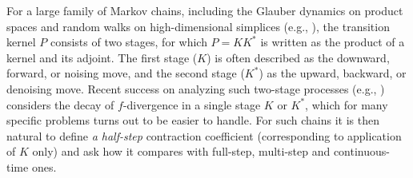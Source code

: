 \documentclass[11pt]{article}
\theoremstyle{definition}
\begin{document}
For a large family of Markov chains, including the Glauber dynamics on product spaces and random walks on
high-dimensional simplices (e.g., \cite{kaufman2017high}), the transition kernel $P$ consists of
two stages, for which $P=KK^*$ is written as the
product of a kernel and its adjoint. The first stage ($K$) is often described as the downward, forward, or
noising move, and the second stage ($K^*$) as the upward, backward, or denoising move.  Recent success
on analyzing such two-stage processes (e.g., \cite{anari2019log,chen2021optimal,chen2022localization}) considers the decay
of $f$-divergence in a
single stage $K$ or $K^*$, which for many specific problems turns out to
be easier to handle. For such chains it is then natural to define \textit{a half-step}
contraction coefficient (corresponding to application of $K$ only) and ask how it compares with full-step, multi-step and continuous-time
ones.
\end{document}
